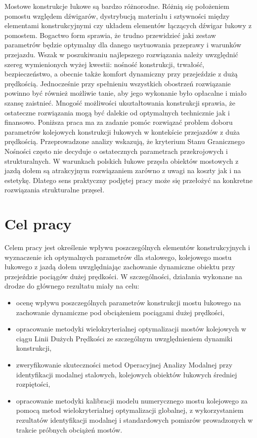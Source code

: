 Mostowe konstrukcje łukowe są bardzo różnorodne. Różnią się położeniem pomostu względem dźwigarów, dystrybucją materiału i sztywności między elementami konstrukcyjnymi czy układem elementów łączących dźwigar łukowy z pomostem. Bogactwo form sprawia, że trudno przewidzieć jaki zestaw parametrów będzie optymalny dla danego usytuowania przeprawy i warunków przejazdu. Wszak w poszukiwaniu najlepszego rozwiązania należy uwzględnić szereg wymienionych wyżej kwestii: nośność konstrukcji, trwałość, bezpieczeństwo, a obecnie także komfort dynamiczny przy przejeździe z dużą prędkością. Jednocześnie przy spełnieniu wszystkich obostrzeń rozwiązanie powinno być również możliwie tanie, aby jego wykonanie było opłacalne i miało szansę zaistnieć. Mnogość możliwości ukształtowania konstrukcji sprawia, że ostateczne rozwiązania mogą być dalekie od optymalnych technicznie jak i finansowo. Poniższa praca ma za zadanie pomóc rozwiązać problem doboru parametrów kolejowych konstrukcji łukowych w kontekście przejazdów z duża prędkością. Przeprowadzone analizy wskazują, że kryterium Stanu Granicznego Nośności często nie decyduje o ostatecznych parametrach przekrojowych i strukturalnych. W warunkach polskich łukowe przęsła obiektów mostowych z jazdą dołem są atrakcyjnym rozwiązaniem zarówno z uwagi na koszty jak i na estetykę. Dlatego sens praktyczny podjętej pracy może się przełożyć na konkretne rozwiązania strukturalne przęseł.


\section*{Cel pracy}
Celem pracy jest określenie wpływu poszczególnych elementów konstrukcyjnych i wyznaczenie ich optymalnych parametrów dla stalowego, kolejowego mostu łukowego z jazdą dołem uwzględniając zachowanie dynamiczne obiektu przy przejeździe pociągów dużej prędkości.
W szczególności, działania wykonane na drodze do głównego rezultatu miały na celu:
\begin{itemize}
	\item ocenę wpływu poszczególnych parametrów konstrukcji mostu łukowego na zachowanie dynamiczne pod obciążeniem pociągami dużej prędkości,
	\item opracowanie metodyki wielokryterialnej optymalizacji mostów kolejowych w ciągu Linii Dużych Prędkości ze szczególnym uwzględnieniem dynamiki konstrukcji,
	\item zweryfikowanie skuteczności metod Operacyjnej Analizy Modalnej przy identyfikacji modalnej stalowych, kolejowych obiektów łukowych średniej rozpiętości,
	\item opracowanie metodyki kalibracji modelu numerycznego mostu kolejowego za pomocą metod wielokryterialnej optymalizacji globalnej, z wykorzystaniem rezultatów identyfikacji modalnej i standardowych pomiarów prowadzonych w trakcie próbnych obciążeń mostów.


\end{itemize}


